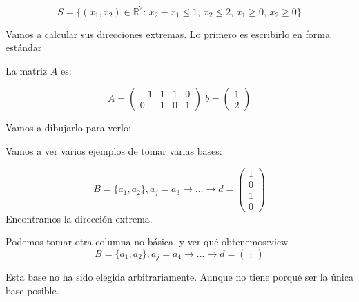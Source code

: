 \begin{example}

\[S = \{(x_1,x_2)\in\mathbb{R}^2:\, x_2-x_1\leq 1,\, x_2\leq 2,\, x_1\geq 0,\, x_2\geq 0\}\]

Vamos a calcular sus direcciones extremas. Lo primero es escribirlo en forma estándar

\begin{ioprob}
\end{ioprob}

La matriz $A$ es:

\[A = \begin{pmatrix}-1&1&1&0\\0&1&0&1\end{pmatrix}\; b = \begin{pmatrix}1\\2\end{pmatrix}\]

Vamos a dibujarlo para verlo:

\begin{figure}[h]
\centering
{}
\end{figure}


Vamos a ver varios ejemplos de tomar varias bases:

\[
B = \{a_1,a_2\}, a_j = a_3 \to ... \to d = \begin{pmatrix}1\\0\\\hline1\\0\end{pmatrix}
\]
Encontramos la dirección extrema.

Podemos tomar otra columna no básica, y ver qué obtenemos:view
\[
B = \{a_1,a_2\}, a_j = a_4 \to ... \to d = \begin{pmatrix}\vdots\end{pmatrix}
\]

Esta base no ha sido elegida arbitrariamente. Aunque no tiene porqué ser la única base posible.
\end{example}

